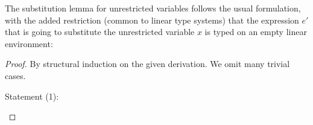 

The substitution lemma for unrestricted variables follows the usual
formulation, with the added restriction (common to linear type systems) that
the expression $e'$ that is going to substitute the unrestricted variable $x$
is typed on an empty linear environment:
%
\UnrestrictedSubstitutionLemma
%



\begin{proof}
By structural induction on the given derivation. We omit many trivial cases.

Statement (1):
\begin{description}




\end{description}
\end{proof}
